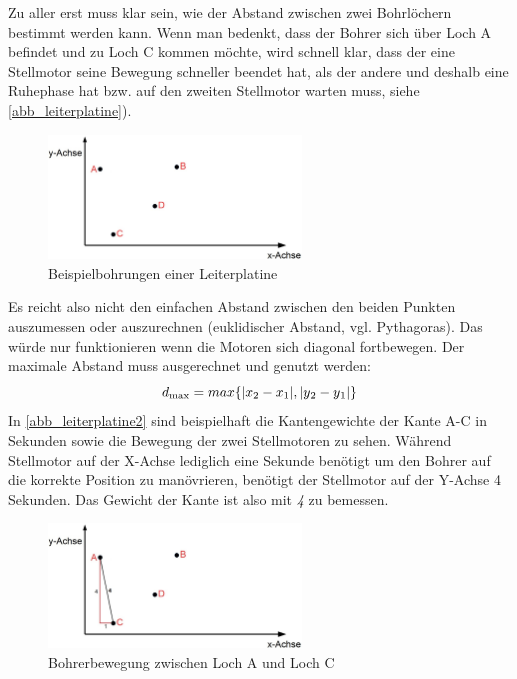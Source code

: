\documentclass{article}
\begin{document}
Zu aller erst muss klar sein, wie der Abstand zwischen zwei Bohrlöchern bestimmt werden kann. Wenn man bedenkt, dass der Bohrer sich über Loch A befindet und zu Loch C kommen möchte, wird schnell klar, dass der eine Stellmotor seine Bewegung schneller beendet hat, als der andere und deshalb eine Ruhephase hat bzw. auf den zweiten Stellmotor warten muss, siehe  \autoref{abb_leiterplatine}).

\begin{figure}[H]
	\centering
	\includegraphics[width=0.6\textwidth]{leiterplatine.jpg}
	\caption{Beispielbohrungen einer Leiterplatine}
	\label{abb_leiterplatine}
\end{figure}

Es reicht also nicht den einfachen Abstand zwischen den beiden Punkten auszumessen oder auszurechnen (euklidischer Abstand, vgl. Pythagoras). Das würde nur funktionieren wenn die Motoren sich diagonal fortbewegen. Der maximale Abstand muss ausgerechnet und genutzt werden:
\[d\textsubscript{max} = max\{ |x\textsubscript{2} - x\textsubscript{1}| , |y\textsubscript{2} - y\textsubscript{1}|\} \]
In \autoref{abb_leiterplatine2} sind beispielhaft die Kantengewichte der Kante A-C in Sekunden sowie die Bewegung der zwei Stellmotoren zu sehen. Während Stellmotor auf der X-Achse lediglich eine Sekunde benötigt um den Bohrer auf die korrekte Position zu manövrieren, benötigt der Stellmotor auf der Y-Achse 4 Sekunden. Das Gewicht der Kante ist also mit \textit{4} zu bemessen.

\begin{figure}[H]
	\centering
	\includegraphics[width=0.6\textwidth]{leiterplatine2.jpg}
	\caption{Bohrerbewegung zwischen Loch A und Loch C}
	\label{abb_leiterplatine2}
\end{figure}
\end{document}
